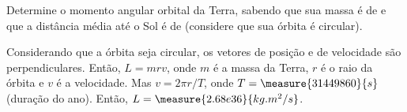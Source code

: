 \begin{question}
    Determine o momento angular orbital da Terra, sabendo que sua massa é de  e que a distância média até o Sol é de  (considere que sua órbita é circular).

    \begin{answer}
    \end{answer}
    
    \begin{solution}
      Considerando que a órbita seja circular, os vetores de posição e de velocidade são perpendiculares.
      Então, $L = mrv$, onde $m$ é a massa da Terra, $r$ é o raio da órbita e $v$ é a velocidade.
      Mas $v = 2\pi r/T$, onde $T = \measure{31449860}{s}$ (duração do ano).
      Então, $L = \measure{2.68e36}{kg.m^2/s}$.
    \end{solution}
\end{question}